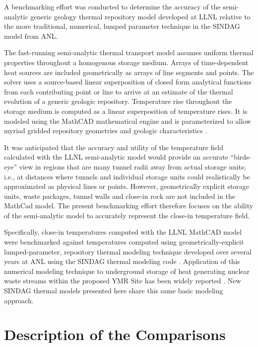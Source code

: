 
A benchmarking effort was conducted to determine the accuracy of the 
semi-analytic generic geology thermal repository model developed at 
\gls{LLNL}\cite{hardin_generic_2011,greenberg_investigations_2011,greenberg_application_2012} 
relative to the more traditional, numerical, lumped parameter technique in the 
\gls{SINDAG} model from \gls{ANL}.

The fast-running semi-analytic thermal transport model assumes uniform thermal 
properties throughout a homogenous storage medium. Arrays of time-dependent heat 
sources are included geometrically as arrays of line segments and points.  The 
solver uses a source-based linear superposition of closed form analytical 
functions from each contributing point or line to arrive at an estimate of the 
thermal evolution of a generic geologic repository.  Temperature rise throughout 
the storage medium is computed as a linear superposition of temperature rises.  
It is modeled using the MathCAD mathematical engine and is parameterized to 
allow myriad gridded repository geometries and geologic characteristics 
\cite{ptc_mathcad_2010}.

It was anticipated that the accuracy and utility of the temperature field
calculated with the \gls{LLNL} semi-analytic model would provide an accurate 
``birds-eye''
view in regions that are many tunnel radii away from actual storage units;
i.e., at distances where tunnels and individual storage units could
realistically be approximated as physical lines or points. 
However, geometrically explicit storage units, waste packages, tunnel
walls and close-in rock are not included in the MathCad model. 
The present benchmarking effort therefore focuses on the ability of the 
semi-analytic model to accurately represent the close-in
temperature field.

Specifically, close-in temperatures computed with the \gls{LLNL} MathCAD model 
were benchmarked against temperatures computed using geometrically-explicit 
lumped-parameter, repository thermal modeling technique developed over several 
years at \gls{ANL} using the \gls{SINDAG} thermal modeling code 
\cite{gaski_sinda_1987}. Application of this numerical modeling technique to 
underground storage of heat generating nuclear waste streams within the proposed 
\gls{YMR} Site has been widely reported \cite{wigeland_separations_2006}.  New 
\gls{SINDAG} thermal models presented here share this same basic modeling 
approach. 

\section{Description of the Comparisons}

